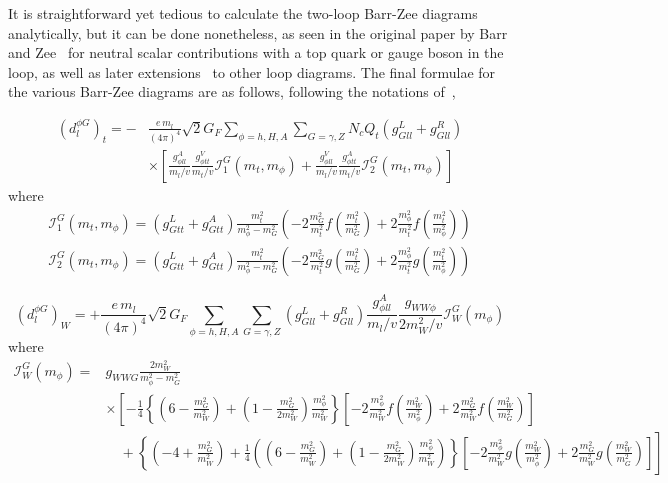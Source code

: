 It is straightforward yet tedious to calculate the two-loop Barr-Zee diagrams analytically, but it can be done nonetheless, 
as seen in the original paper by Barr and Zee~\cite{BarrZee} for neutral scalar contributions with a top quark or gauge boson in the loop,
as well as later extensions~\cite{MoreBarrZee} to other loop diagrams.
The final formulae for the various Barr-Zee diagrams are as follows, following the notations of~\cite{Abe},

\begin{align}\label{eq:BarrZee-phiG-toploop}
	(d^{\phi G}_{l})_{t} = -&\frac{e\,m_{l}}{(4\pi)^{4}}\sqrt{2}G_{F}\sum_{\phi=h,H,A}\sum_{G=\gamma,Z}N_{c}Q_{t}(g_{Gll}^{L}+g_{Gll}^{R}) \nonumber \\
	& \times \left[\frac{g_{\phi ll}^{A}}{m_{l}/v}\frac{g_{\phi tt}^{V}}{m_{t}/v}\mathcal{I}_{1}^{G}(m_{t}, m_{\phi}) + \frac{g_{\phi ll}^{V}}{m_{l}/v}\frac{g_{\phi tt}^{A}}{m_{t}/v}\mathcal{I}_{2}^{G}(m_{t}, m_{\phi})\right]
\end{align}
where
\begin{align}
	\mathcal{I}_{1}^{G}(m_{t},m_{\phi}) = (g_{Gtt}^{L}+g_{Gtt}^{A})\frac{m_{t}^{2}}{m_{\phi}^{2}-m_{G}^{2}}
	\left(-2\frac{m_{G}^{2}}{m_{t}^{2}} f\left(\frac{m_{t}^{2}}{m_{G}^{2}}\right) + 2\frac{m_{\phi}^{2}}{m_{t}^{2}} f\left(\frac{m_{t}^{2}}{m_{\phi}^{2}}\right)\right) \nonumber \\
	\mathcal{I}_{2}^{G}(m_{t},m_{\phi}) = (g_{Gtt}^{L}+g_{Gtt}^{A})\frac{m_{t}^{2}}{m_{\phi}^{2}-m_{G}^{2}}
	\left(-2\frac{m_{G}^{2}}{m_{t}^{2}} g\left(\frac{m_{t}^{2}}{m_{G}^{2}}\right) + 2\frac{m_{\phi}^{2}}{m_{t}^{2}} g\left(\frac{m_{t}^{2}}{m_{\phi}^{2}}\right)\right)
\end{align}

\begin{equation}\label{eq:BarrZee-phiG-Wloop}
	(d^{\phi G}_{l})_{W} = +\frac{e\,m_{l}}{(4\pi)^{4}}\sqrt{2}G_{F}\sum_{\phi=h,H,A}\sum_{G=\gamma,Z}(g_{Gll}^{L}+g_{Gll}^{R})\frac{g_{\phi ll}^{A}}{m_{l}/v}\frac{g_{WW\phi}}{2m_{W}^{2}/v}\mathcal{I}_{W}^{G}(m_{\phi})
\end{equation}
where
\begin{align}
	\mathcal{I}_{W}^{G}(m_{\phi}) = &g_{WWG}\frac{2m_{W}^{2}}{m_{\phi}^{2}-m_{G}^{2}} \nonumber \\
	& \times \left[-\frac{1}{4}\left\{\left(6-\frac{m_{G}^{2}}{m_{W}^{2}}\right) + \left(1-\frac{m_{G}^{2}}{2m_{W}^{2}}\right)\frac{m_{\phi}^{2}}{m_{W}^{2}}\right\}
	\left[-2\frac{m_{\phi}^{2}}{m_{W}^{2}} f\left(\frac{m_{W}^{2}}{m_{\phi}^{2}}\right) + 2\frac{m_{G}^{2}}{m_{W}^{2}} f\left(\frac{m_{W}^{2}}{m_{G}^{2}}\right)\right]\right. \nonumber \\
	&\left. \quad + \left\{\left(-4+\frac{m_{G}^{2}}{m_{W}^{2}}\right) + \frac{1}{4}\left(\left(6-\frac{m_{G}^{2}}{m_{W}^{2}}\right) + \left(1-\frac{m_{G}^{2}}{2m_{W}^{2}}\right)\frac{m_{\phi}^{2}}{m_{W}^{2}}\right)\right\}
	\left[-2\frac{m_{\phi}^{2}}{m_{W}^{2}} g\left(\frac{m_{W}^{2}}{m_{\phi}^{2}}\right) + 2\frac{m_{G}^{2}}{m_{W}^{2}} g\left(\frac{m_{W}^{2}}{m_{G}^{2}}\right)\right]\right]
\end{align}


